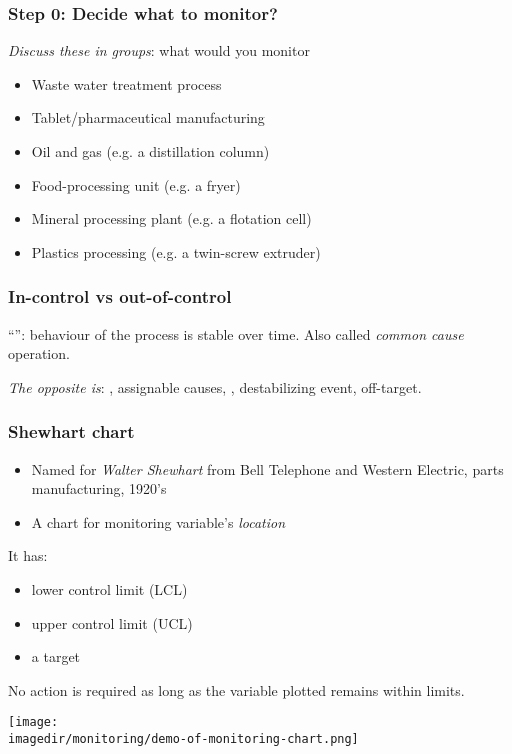 \begin{frame}\frametitle{Step 0: Decide what to monitor?}

	\emph{Discuss these in groups}: what would you monitor
	\begin{itemize}
		\item	Waste water treatment process
		\item	Tablet/pharmaceutical manufacturing
		\item	Oil and gas (e.g. a distillation column)
		\item	Food-processing unit (e.g. a fryer)
		\item	Mineral processing plant (e.g. a flotation cell)
		\item	Plastics processing (e.g. a twin-screw extruder)
	\end{itemize}
\end{frame}

\begin{frame}\frametitle{In-control vs out-of-control}
	\begin{exampleblock}{}
		\begin{center}
			``{\color{purple}{In-control}}'': behaviour of the process is stable over time. Also called \emph{common cause} operation.
		\end{center}
	\end{exampleblock}
	\vspace{24pt}
	\emph{The opposite is}: {\color{purple}{out of control}}, assignable causes, {\color{purple}{special causes}}, destabilizing event, off-target.
\end{frame}

\begin{frame}\frametitle{Shewhart chart}
	\begin{itemize}
		\item	Named for \emph{Walter Shewhart} from Bell Telephone and Western Electric, parts manufacturing, 1920's
		\item	A chart for monitoring variable's \emph{location}
	\end{itemize}

	\vspace{12pt}

	It has:
	\begin{itemize}
		\item	lower control limit (LCL)
		\item	upper control limit (UCL)
		\item	a target
	\end{itemize}

	\vspace{12pt}
	No action is required as long as the variable plotted remains within limits.

	\begin{center}
		\texttt{[image: \\imagedir/monitoring/demo-of-monitoring-chart.png]}
	\end{center}
\end{frame}

